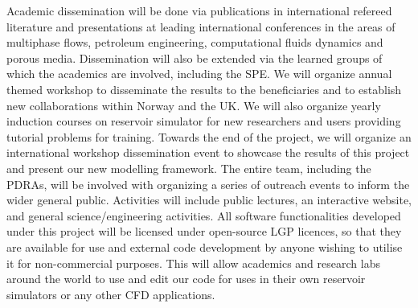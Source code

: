 \documentclass[12pts,a4paper,amsmath,amssymb,floatfix]{article}%
\begin{document}
Academic dissemination will be done via publications in international refereed literature and presentations at leading international conferences in the areas of multiphase flows, petroleum engineering, computational fluids dynamics and porous media.
Dissemination will also be extended via the learned groups of which the academics are involved, including the SPE. We will organize annual themed workshop to disseminate the results to the beneficiaries and to establish new collaborations within Norway and the UK. We will also organize yearly induction courses on reservoir simulator for new researchers and users providing tutorial problems for training. Towards the end of the project, we will organize an international workshop dissemination event to showcase the results of this project and present our new modelling framework. The entire team, including the PDRAs, will be involved with organizing a series of outreach events to inform the wider general public. Activities will include public lectures, an interactive website, and general science/engineering activities. 
All software functionalities developed under this project will be licensed under open-source LGP licences, so that they are available for use and external code development by anyone wishing to utilise it for non-commercial purposes.  This will allow academics and research labs around the world to use and edit our code for uses in their own reservoir simulators or any other CFD applications.

 
\end{document}
